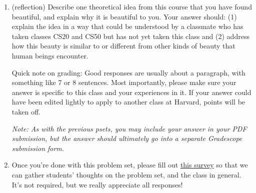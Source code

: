 \documentclass[11pt]{article}
\begin{document}
\begin{enumerate}
Show that if $\NPsearch\subset \Psearch$, then there is an algorithm to solve \Factoring in time $O((\log N)^c)$, for some $c=O(1)$. Be careful about the length of input in base 2.

\textit{(Fun Fact: A remarkable property of quantum computers is that they can solve \Factoring in polynomial time, via Shor's algorithm. This does not mean that quantum computers can solve any problem in $\NPsearch$ in polynomial time, as \Factoring is not believed to be $\NPsearch$-complete).
}

\item (reflection) Describe one theoretical idea from this course that you have found beautiful, and explain why it is beautiful to you.  Your answer should: (1) explain the idea in a way that could be understood by a classmate who has taken classes CS20 and CS50 but has not yet taken this class and (2) address how this beauty is similar to or different from other kinds of beauty that human beings encounter.

Quick note on grading: Good responses are usually about a paragraph, with something like 7 or 8 sentences. Most importantly, please make sure your answer is specific to this class and your experiences in it. If your answer could have been edited lightly to apply to another class at Harvard, points will be taken off.

\textit{Note: As with the previous psets, you may include your answer in your PDF submission, but the answer should ultimately go into a separate Gradescope submission form.}

\item Once you're done with this problem set, please fill out \href{https://forms.gle/UWfAWiH9SdEjMQos7}{this survey} so that we can gather students' thoughts on the problem set, and the class in general. It's not required, but we really appreciate all responses!

\end{enumerate}
\end{document}
